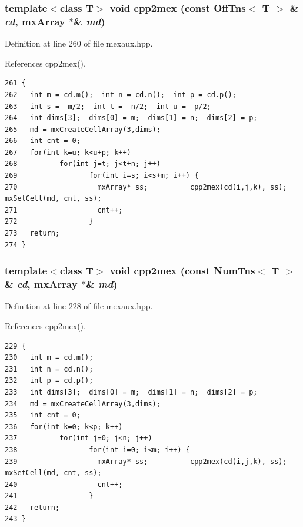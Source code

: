 \subsubsection{\setlength{\rightskip}{0pt plus 5cm}template$<$class T$>$ void cpp2mex (const Off\-Tns$<$ T $>$ \& {\em cd}, mx\-Array $\ast$\& {\em md})\hspace{0.3cm}{\tt  [inline]}}\label{mexaux_8hpp_6e43c13ccac9ca2c8927bf2ecefc3c3f_6e43c13ccac9ca2c8927bf2ecefc3c3f}




Definition at line 260 of file mexaux.hpp.

References cpp2mex().

\footnotesize\begin{verbatim}261 {
262   int m = cd.m();  int n = cd.n();  int p = cd.p();
263   int s = -m/2;  int t = -n/2;  int u = -p/2;
264   int dims[3];  dims[0] = m;  dims[1] = n;  dims[2] = p;
265   md = mxCreateCellArray(3,dims);
266   int cnt = 0;
267   for(int k=u; k<u+p; k++)
268          for(int j=t; j<t+n; j++)
269                 for(int i=s; i<s+m; i++) {
270                   mxArray* ss;          cpp2mex(cd(i,j,k), ss);         mxSetCell(md, cnt, ss);
271                   cnt++;
272                 }
273   return;
274 }
\end{verbatim}\normalsize 


\subsubsection{\setlength{\rightskip}{0pt plus 5cm}template$<$class T$>$ void cpp2mex (const Num\-Tns$<$ T $>$ \& {\em cd}, mx\-Array $\ast$\& {\em md})\hspace{0.3cm}{\tt  [inline]}}\label{mexaux_8hpp_d9e0bb4414e83186da5f55fc2db2e767_d9e0bb4414e83186da5f55fc2db2e767}




Definition at line 228 of file mexaux.hpp.

References cpp2mex().

\footnotesize\begin{verbatim}229 {
230   int m = cd.m();
231   int n = cd.n();
232   int p = cd.p();
233   int dims[3];  dims[0] = m;  dims[1] = n;  dims[2] = p;
234   md = mxCreateCellArray(3,dims);
235   int cnt = 0;
236   for(int k=0; k<p; k++)
237          for(int j=0; j<n; j++)
238                 for(int i=0; i<m; i++) {
239                   mxArray* ss;          cpp2mex(cd(i,j,k), ss);         mxSetCell(md, cnt, ss);
240                   cnt++;
241                 }
242   return;
243 }
\end{verbatim}\normalsize 


